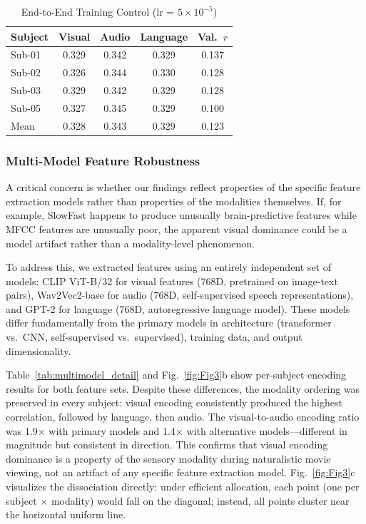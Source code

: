 \documentclass[conference]{IEEEtran}
\begin{document}
\begin{table}[t]
\caption{End-to-End Training Control (lr = $5 \times 10^{-5}$)}
\label{tab:e2e_detail}
\centering
\begin{tabular*}{\columnwidth}{@{\extracolsep{\fill}}lcccc@{}}
\toprule
Subject & Visual & Audio & Language & Val.\ $r$ \\
\midrule
Sub-01 & 0.329 & 0.342 & 0.329 & 0.137 \\
Sub-02 & 0.326 & 0.344 & 0.330 & 0.128 \\
Sub-03 & 0.329 & 0.342 & 0.329 & 0.128 \\
Sub-05 & 0.327 & 0.345 & 0.329 & 0.100 \\
\midrule
Mean & 0.328 & 0.343 & 0.329 & 0.123 \\
\bottomrule
\end{tabular*}
\end{table}

\subsubsection{Multi-Model Feature Robustness}\label{sec:multimodel}
A critical concern is whether our findings reflect properties of the specific feature extraction models rather than properties of the modalities themselves. If, for example, SlowFast happens to produce unusually brain-predictive features while MFCC features are unusually poor, the apparent visual dominance could be a model artifact rather than a modality-level phenomenon.

To address this, we extracted features using an entirely independent set of models: CLIP ViT-B/32 \cite{radford2021learning} for visual features (768D, pretrained on image-text pairs), Wav2Vec2-base \cite{baevski2020wav2vec} for audio (768D, self-supervised speech representations), and GPT-2 \cite{radford2019language} for language (768D, autoregressive language model). These models differ fundamentally from the primary models in architecture (transformer vs.\ CNN, self-supervised vs.\ supervised), training data, and output dimensionality.

Table~\ref{tab:multimodel_detail} and Fig.~\ref{fig:Fig3}b show per-subject encoding results for both feature sets. Despite these differences, the modality ordering was preserved in every subject: visual encoding consistently produced the highest correlation, followed by language, then audio. The visual-to-audio encoding ratio was 1.9$\times$ with primary models and 1.4$\times$ with alternative models---different in magnitude but consistent in direction. This confirms that visual encoding dominance is a property of the sensory modality during naturalistic movie viewing, not an artifact of any specific feature extraction model. Fig.~\ref{fig:Fig3}c visualizes the dissociation directly: under efficient allocation, each point (one per subject $\times$ modality) would fall on the diagonal; instead, all points cluster near the horizontal uniform line.
\end{document}
